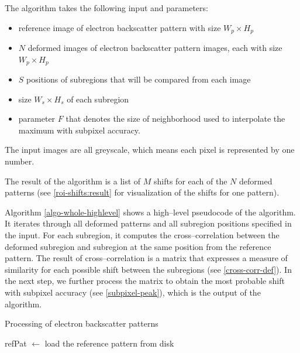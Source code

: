 The algorithm takes the following input and parameters:
\begin{itemize}
	\item reference image of electron backscatter pattern with size $W_p \times H_p$
	\item $N$ deformed images of electron backscatter pattern images, each with size $W_p \times H_p$
	\item $S$ positions of subregions that will be compared from each image
	\item size $W_s \times H_s$ of each subregion
	\item parameter $F$ that denotes the size of neighborhood used to interpolate the maximum with subpixel accuracy.
\end{itemize}
The input images are all greyscale, which means each pixel is represented by one number.

The result of the algorithm is a list of $M$ shifts for each of the $N$ deformed patterns (see \cref{roi-shifts:result} for visualization of the shifts for one pattern).

Algorithm \ref{algo-whole-highlevel} shows a high--level pseudocode of the algorithm. It iterates through all deformed patterns and all subregion positions specified in the input. For each subregion, it computes the cross--correlation between the deformed subregion and subregion at the same position from the reference pattern. The result of cross--correlation is a matrix that expresses a measure of similarity for each possible shift between the subregions (see \cref{cross-corr-def}). In the next step, we further process the matrix to obtain the most probable shift with subpixel accuracy (see \cref{subpixel-peak}), which is the output of the algorithm.

\begin{algorithm}
	\caption{Processing of electron backscatter patterns}
	\label{algo-whole-highlevel}
	\vspace{5px}
	
	refPat  $\leftarrow$ load the reference pattern from disk\;
\end{algorithm}

